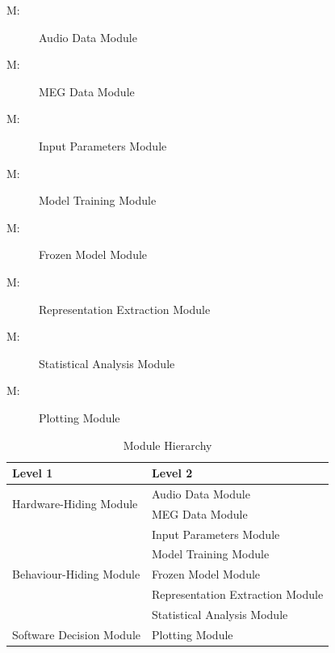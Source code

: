 \documentclass[12pt, titlepage]{article}
\newcounter{mnum}
\newcommand{\mthemnum}{M\themnum}
\begin{document}
\begin{description}
\item[ \mthemnum \label{mAudio}:] Audio Data Module
\item[ \mthemnum \label{mMEG}:] MEG Data Module

\item[ \mthemnum \label{mParams}:] Input Parameters Module
\item[ \mthemnum \label{mTrain}:] Model Training Module
\item[ \mthemnum \label{mFrozen}:] Frozen Model Module
\item[ \mthemnum \label{mExtract}:] Representation Extraction Module
\item[ \mthemnum \label{mStats}:] Statistical Analysis Module

\item[ \mthemnum \label{mPlot}:] Plotting Module
\end{description}







\begin{table}[h!]
\centering
\begin{tabular}{p{} p{}}
\toprule
\textbf{Level 1} & \textbf{Level 2}\\
\midrule

\multirow{2}{0.3\textwidth}{Hardware-Hiding Module}
& Audio Data Module\\
& MEG Data Module\\
\midrule

\multirow{5}{0.3\textwidth}{Behaviour-Hiding Module}
& Input Parameters Module\\
& Model Training Module\\
& Frozen Model Module\\
& Representation Extraction Module\\
& Statistical Analysis Module\\
\midrule

\multirow{1}{0.3\textwidth}{Software Decision Module}
& Plotting Module\\
\bottomrule
\end{tabular}
\caption{Module Hierarchy}
\label{TblMH}
\end{table}
\end{document}
